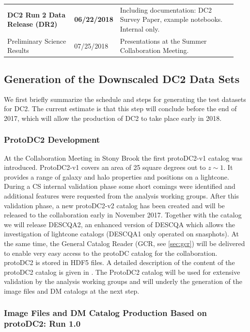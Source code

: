 \documentclass[preprint,times]{aastex61}
\begin{document}
\begin{table}[!htb]
\begin{tabular}{|L{0.3\linewidth}|C{0.11\linewidth}|L{0.53\linewidth}|}
    \textbf{DC2 Run 2 Data Release (DR2)}       & \textbf{06/22/2018} & Including documentation: DC2 Survey Paper, example notebooks. Internal only. \\     
    Preliminary Science Results              & 07/25/2018 & Presentations at the Summer Collaboration Meeting. \\ 
   \hline
  \end{tabular}
\end{table}

\subsection{Generation of the Downscaled DC2 Data Sets}

We first briefly summarize the schedule and steps for generating the test datasets for DC2. The current estimate is that this step will conclude before the end of 2017, which will allow the production of DC2 to take place early in 2018. 

\subsubsection{ProtoDC2 Development}

At the Collaboration Meeting in Stony Brook 
the first protoDC2-v1 catalog was introduced. 
ProtoDC2-v1 covers an area of 25 square degrees out to $z\sim 1$. It provides a range of galaxy and halo properties and positions on a lightcone. During a CS internal validation phase some short comings were identified and additional features were requested from the analysis working groups. After this validation phase, a new protoDC2-v2 catalog has been created and will be released to the collaboration early in November 2017. Together with the catalog we will release DESCQA2, an enhanced version of DESCQA which allows the investigation of lightcone catalogs (DESCQA1 only operated on snasphots). At the same time, the General Catalog Reader (GCR, see \autoref{sec:gcr}) will be delivered to enable very easy access to the protoDC catalog for the collaboration. protoDC2 is stored in HDF5 files. A detailed description of the content of the protoDC2 catalog is given in \cite{protoDC2}. The ProtoDC2 catalog will be used for extensive validation by the analysis working groups and will underly the generation of the image files and DM catalogs at the next step.

\subsubsection{Image Files and DM Catalog Production Based on protoDC2: Run 1.0}
\end{document}
